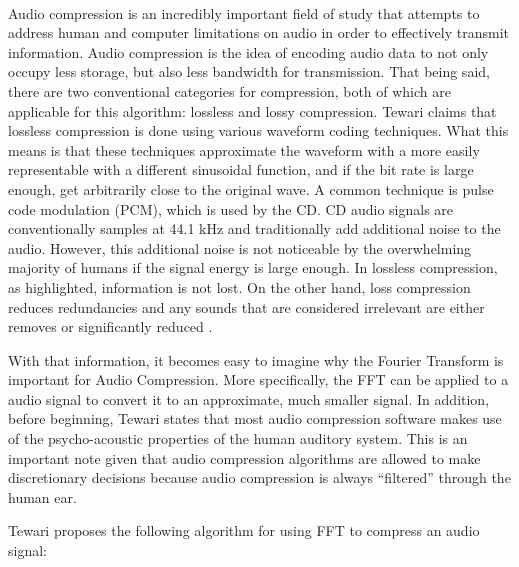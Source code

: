 \documentclass{amsproc}
\begin{document}
\mbox{}	 \\
\indent Audio compression is an incredibly important field of study that attempts to address human and computer limitations on audio in order to effectively transmit information. Audio compression is the idea of encoding audio data to not only occupy less storage, but also less bandwidth for transmission. That being said, there are two conventional categories for compression, both of which are applicable for this algorithm: lossless and lossy compression. Tewari claims that lossless compression is done using various waveform coding techniques. What this means is that these techniques approximate the waveform with a more easily representable with a different sinusoidal function, and if the bit rate is large enough, get arbitrarily close to the original wave. A common technique is pulse code modulation (PCM), which is used by the CD. CD audio signals are conventionally samples at 44.1 kHz and traditionally add additional noise to the audio. However, this additional noise is not noticeable by the overwhelming majority of humans if the signal energy is large enough. In lossless compression, as highlighted, information is not lost. On the other hand, loss compression reduces redundancies  and any sounds that are considered irrelevant are either removes or significantly reduced \cite{Tewari}.

With that information, it becomes easy to imagine why the Fourier Transform is important for Audio Compression. More specifically, the FFT can be applied to a audio signal to convert it to an approximate, much smaller signal. In addition, before beginning, Tewari states that most audio compression software makes use of the psycho-acoustic properties of the human auditory system. This is an important note given that audio compression algorithms are allowed to make discretionary decisions because audio compression is always ``filtered'' through the human ear. 

Tewari proposes the following algorithm for using FFT to compress an audio signal:
\end{document}
